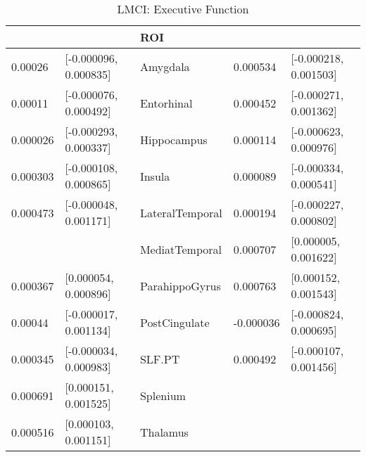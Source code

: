 \documentclass{article}
\begin{document}
\begin{table}[H]
\centering
\caption{LMCI: Executive Function} 
\begin{tabular}{lllll}
  \toprule
\cellcolor{red!30}{B2} & \cellcolor{red!30}{CI} & ROI & \cellcolor{blue!30}{B3} & \cellcolor{blue!30}{CI} \\ 
  \midrule
0.00026 & [-0.000096, 0.000835] & Amygdala & 0.000534 & [-0.000218, 0.001503] \\ 
  0.00011 & [-0.000076, 0.000492] & Entorhinal & 0.000452 & [-0.000271, 0.001362] \\ 
  0.000026 & [-0.000293, 0.000337] & Hippocampus & 0.000114 & [-0.000623, 0.000976] \\ 
  0.000303 & [-0.000108, 0.000865] & Insula & 0.000089 & [-0.000334, 0.000541] \\ 
  0.000473 & [-0.000048, 0.001171] & LateralTemporal & 0.000194 & [-0.000227, 0.000802] \\ 
   \rowcolor{blue!30}\cellcolor{white}{0.000241} & \cellcolor{white}{[-0.000007, 0.000703]} & MediatTemporal & 0.000707 & [0.000005, 0.001622] \\ 
   \rowcolor{green!30}0.000367 & [0.000054, 0.000896] & ParahippoGyrus & 0.000763 & [0.000152, 0.001543] \\ 
  0.00044 & [-0.000017, 0.001134] & PostCingulate & -0.000036 & [-0.000824, 0.000695] \\ 
  0.000345 & [-0.000034, 0.000983] & SLF.PT & 0.000492 & [-0.000107, 0.001456] \\ 
   \rowcolor{red!30}0.000691 & [0.000151, 0.001525] & Splenium & \cellcolor{white}{0.000317} & \cellcolor{white}{[-0.000408, 0.001047]} \\ 
   \rowcolor{red!30}0.000516 & [0.000103, 0.001151] & Thalamus & \cellcolor{white}{0.000449} & \cellcolor{white}{[-0.000142, 0.001144]} \\ 
   \bottomrule
\end{tabular}
\end{table}
\end{document}
